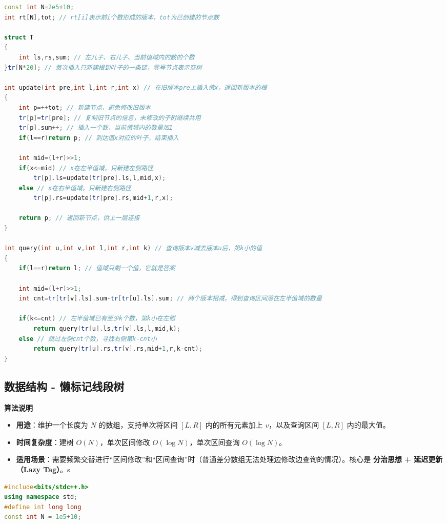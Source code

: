 \documentclass[10pt,landscape,a4paper]{article}
\begin{document}
\begin{multicols*}{3}
\begin{lstlisting}[language=C++]
const int N=2e5+10;
int rt[N],tot; // rt[i]表示前i个数形成的版本，tot为已创建的节点数

struct T
{
    int ls,rs,sum; // 左儿子、右儿子、当前值域内的数的个数
}tr[N*20]; // 每次插入只新建根到叶子的一条链，零号节点表示空树

int update(int pre,int l,int r,int x) // 在旧版本pre上插入值x，返回新版本的根
{
    int p=++tot; // 新建节点，避免修改旧版本
    tr[p]=tr[pre]; // 复制旧节点的信息，未修改的子树继续共用
    tr[p].sum++; // 插入一个数，当前值域内的数量加1
    if(l==r)return p; // 到达值x对应的叶子，结束插入

    int mid=(l+r)>>1;
    if(x<=mid) // x在左半值域，只新建左侧路径
        tr[p].ls=update(tr[pre].ls,l,mid,x);
    else // x在右半值域，只新建右侧路径
        tr[p].rs=update(tr[pre].rs,mid+1,r,x);

    return p; // 返回新节点，供上一层连接
}

int query(int u,int v,int l,int r,int k) // 查询版本v减去版本u后，第k小的值
{
    if(l==r)return l; // 值域只剩一个值，它就是答案

    int mid=(l+r)>>1;
    int cnt=tr[tr[v].ls].sum-tr[tr[u].ls].sum; // 两个版本相减，得到查询区间落在左半值域的数量

    if(k<=cnt) // 左半值域已有至少k个数，第k小在左侧
        return query(tr[u].ls,tr[v].ls,l,mid,k);
    else // 跳过左侧cnt个数，寻找右侧第k-cnt小
        return query(tr[u].rs,tr[v].rs,mid+1,r,k-cnt);
}
\end{lstlisting}
\subsection*{数据结构 - 懒标记线段树}
\par\addvspace{0.7ex}\noindent\textbf{算法说明}\par\nobreak
\begin{itemize}
\item \textbf{用途}：维护一个长度为 $N$ 的数组，支持单次将区间 $[L, R]$ 内的所有元素加上 $v$，以及查询区间 $[L, R]$ 内的最大值。
\item \textbf{时间复杂度}：建树 $O(N)$，单次区间修改 $O(\log N)$，单次区间查询 $O(\log N)$。
\item \textbf{适用场景}：需要频繁交替进行“区间修改”和“区间查询”时（普通差分数组无法处理边修改边查询的情况）。核心是 \textbf{分治思想 + 延迟更新（Lazy Tag）}。s
\end{itemize}
\par{}\par
\begin{lstlisting}[language=C++]
#include<bits/stdc++.h>
using namespace std;
#define int long long
const int N = 1e5+10;


\end{lstlisting}
\end{multicols*}
\end{document}
